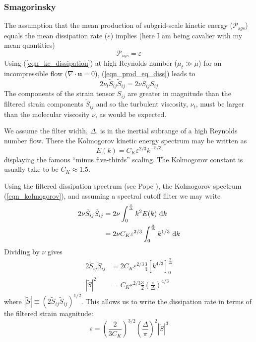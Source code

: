 \subsubsection*{Smagorinsky}

The assumption that the mean production of subgrid-scale kinetic energy ($\mathcal{P}_{sgs}$) equals the mean dissipation rate ($\varepsilon$) implies (here I am being cavalier with my mean quantities)
\begin{equation}
\label{eqn_prod_eq_diss}
\mathcal{P}_{sgs} = \varepsilon
\end{equation}
Using (\ref{eqn_ke_dissipation}) at high Reynolds number ($\mu_t \gg \mu$) for an incompressible flow ($\nabla\!\cdot\mathbf{u} = 0$), (\ref{eqn_prod_eq_diss}) leads to
\begin{equation}
2\nu_t \tilde{S}_{ij}\tilde{S}_{ij} = 2\nu S_{ij} S_{ij}
\end{equation}
The components of the strain tensor $S_{ij}$ are greater in magnitude than the filtered strain components $\tilde{S}_{ij}$ and so the turbulent viscosity, $\nu_t$, must be larger than the molecular viscosity $\nu$, as would be expected.

We assume the filter width, $\Delta$, is in the inertial subrange of a high Reynolds number flow.  There the Kolmogorov kinetic energy spectrum may be written as
\begin{equation}
\label{eqn_kolmogorov}
E(k) = C_K \varepsilon^{2/3} k^{-5/3}
\end{equation}
displaying the famous ``minus five-thirds'' scaling.  The Kolmogorov constant is usually take to be $C_K \approx 1.5$.

Using the filtered dissipation spectrum (see Pope \cite{Pope:2000}), the Kolmogorov spectrum (\ref{eqn_kolmogorov}), and assuming a spectral cutoff filter we may write
\begin{align}
2 \nu \tilde{S}_{ij}\tilde{S}_{ij} &= 2 \nu \int_0^{\frac{\pi}{\Delta}} k^2 E(k) \,\,\mathrm{d} k \\
&= 2 \nu C_K \varepsilon^{2/3} \int_0^{\frac{\pi}{\Delta}} k^{1/3} \,\,\mathrm{d} k
\end{align}
Dividing by $\nu$ gives
\begin{align}
2 \tilde{S}_{ij}\tilde{S}_{ij} &= 2 C_K \varepsilon^{2/3} \frac{3}{4} \left[ k^{4/3} \right]_0^{\frac{\pi}{\Delta}} \\
|\tilde{S}|^2 &= C_K \varepsilon^{2/3} \frac{3}{2} \left(\frac{\pi}{\Delta}\right)^{4/3}
\end{align}
where $|\tilde{S}| \equiv (2 \tilde{S}_{ij}\tilde{S}_{ij})^{1/2}$.  This allows us to write the dissipation rate in terms of the filtered strain magnitude:
\begin{equation}
\label{eqn_diss_strain}
\varepsilon = \left(\frac{2}{3 C_K}\right)^{3/2} \left(\frac{\Delta}{\pi}\right)^2 |\tilde{S}|^3
\end{equation}

